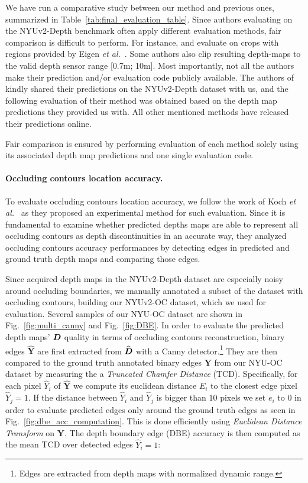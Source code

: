 \documentclass[10pt,twocolumn,letterpaper]{article}
\begin{document}
We have run a comparative study between our method and previous ones, 
summarized in Table~\ref{tab:final_evaluation_table}. 
Since authors evaluating on the NYUv2-Depth benchmark often apply different 
evaluation methods, fair comparison is difficult to perform. For 
instance, \cite{xu2017MS-CRF} and \cite{FuCVPR18-DORN} evaluate on crops 
with regions provided by Eigen \emph{et al.}~\cite{Eigen2015PredictingDS}. 
Some authors also clip resulting depth-maps to the valid depth sensor 
range [0.7m; 10m]. Most importantly, not all the authors make their prediction 
and/or evaluation code publicly available. The authors of \cite{Jiao2018LookDI} 
kindly shared their predictions on the NYUv2-Depth dataset with us, and the 
following evaluation of their method was obtained based on the depth map 
predictions they provided us with. All other mentioned methods have released 
their predictions online.

Fair comparison is ensured by performing evaluation of each method solely using 
its associated depth map predictions and one single evaluation code.

\paragraph{Occluding contours location accuracy.}

To evaluate occluding contours location accuracy, we follow the work 
of Koch \textit{et al.}~\cite{Koch2018EvaluationOC} as they proposed an 
experimental method for such evaluation. Since it is fundamental to examine 
whether predicted depths maps are able to represent all occluding contours as 
depth discontinuities in an accurate way, they analyzed occluding contours 
accuracy performances by detecting edges in predicted and ground 
truth depth maps and comparing those edges.

Since acquired depth maps in the NYUv2-Depth dataset are especially noisy 
around occluding boundaries, we manually annotated a subset of the dataset with 
occluding contours, building our NYUv2-OC dataset, which we used for 
evaluation. Several samples of our NYU-OC dataset are shown in 
Fig.~\ref{fig:multi_canny} and Fig.~\ref{fig:DBE}. In order to evaluate the 
predicted depth maps' $\boldsymbol{D}$ quality in terms of occluding contours 
reconstruction, binary edges $\boldsymbol{\widehat{Y}}$ are first extracted 
from $\widehat{\boldsymbol{D}}$ with a Canny detector.\footnote{Edges are extracted from 
depth maps with normalized dynamic range.} They are then compared to the ground 
truth annotated binary edges $\boldsymbol{Y}$ from our NYU-OC dataset by 
measuring the a \textit{Truncated Chamfer Distance} (TCD).
Specifically, for each pixel $\widehat{Y}_i$ of $\boldsymbol{\widehat{Y}}$ we 
compute its euclidean distance $E_i$ to the closest edge pixel 
$\widehat{Y}_j=1$. If the distance between $\widehat{Y}_i$ and $\widehat{Y}_j$ 
is bigger than $10$ pixels we set $e_i$ to $0$ in order to evaluate predicted 
edges only around the ground truth edges as seen in 
Fig.~\ref{fig:dbe_acc_computation}. This is done efficiently using 
\textit{Euclidean Distance Transform} on $\boldsymbol{Y}$.
The depth boundary edge (DBE) accuracy is then computed as the mean TCD over 
detected edges $\widehat{Y}_i=1$: 
\end{document}
